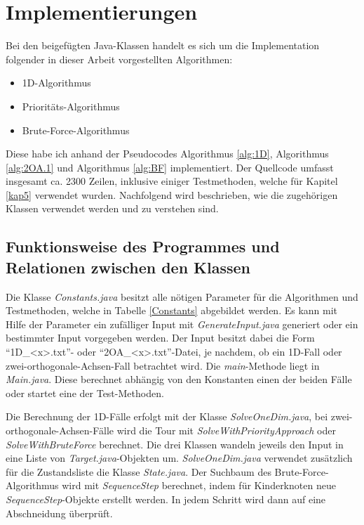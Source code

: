 \documentclass[german,version-2019-11]{uzl-thesis}
\begin{document}
%
\appendix
\chapter{Implementierungen}

Bei den beigefügten Java-Klassen handelt es sich um die Implementation folgender in dieser Arbeit vorgestellten Algorithmen:
\begin{itemize}
\item 1D-Algorithmus
\item Prioritäts-Algorithmus
\item Brute-Force-Algorithmus
\end{itemize} 
Diese habe ich anhand der Pseudocodes Algorithmus \ref{alg:1D}, Algorithmus \ref{alg:2OA.1} und Algorithmus \ref{alg:BF} implementiert. Der Quellcode umfasst insgesamt ca. 2300 Zeilen, inklusive einiger Testmethoden, welche für Kapitel \ref{kap5} verwendet wurden. Nachfolgend wird beschrieben, wie die zugehörigen Klassen verwendet werden und zu verstehen sind. 

\section{Funktionsweise des Programmes und Relationen zwischen den Klassen}
Die Klasse \emph{Constants.java} besitzt alle nötigen Parameter für die Algorithmen und Testmethoden, welche in Tabelle \ref{Constants} abgebildet werden. Es kann mit Hilfe der Parameter ein zufälliger Input mit \emph{GenerateInput.java} generiert oder ein bestimmter Input vorgegeben werden. Der Input besitzt dabei die Form ``1D\_<x>.txt''- oder ``2OA\_<x>.txt''-Datei, je nachdem, ob ein 1D-Fall oder zwei-orthogonale-Achsen-Fall betrachtet wird. Die \emph{main}-Methode liegt in \emph{Main.java}. Diese berechnet abhängig von den Konstanten einen der beiden Fälle oder startet eine der Test-Methoden. 

Die Berechnung der 1D-Fälle erfolgt mit der Klasse \emph{SolveOneDim.java}, bei zwei-\\orthogonale-Achsen-Fälle wird die Tour mit \emph{SolveWithPriorityApproach} oder \emph{SolveWithBruteForce} berechnet. Die drei Klassen wandeln jeweils den Input in eine Liste von \emph{Target.java}-Objekten um. \emph{SolveOneDim.java} verwendet zusätzlich für die Zustandsliste die Klasse \emph{State.java}. Der Suchbaum des Brute-Force-Algorithmus wird mit \emph{SequenceStep} berechnet, indem für Kinderknoten neue \emph{SequenceStep}-Objekte erstellt werden. In jedem Schritt wird dann auf eine Abschneidung überprüft. 
\end{document}
